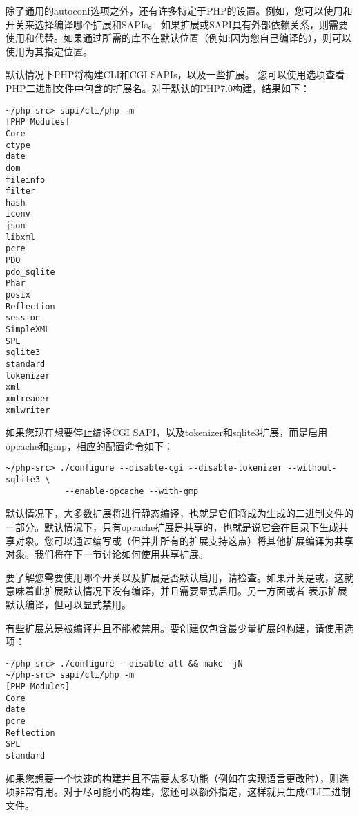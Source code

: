除了通用的autoconf选项之外，还有许多特定于PHP的设置。例如，您可以使用和开关来选择编译哪个扩展和SAPIs。
如果扩展或SAPI具有外部依赖关系，则需要使用和代替。如果通过所需的库不在默认位置（例如:因为您自己编译的），则可以使用为其指定位置。

默认情况下PHP将构建CLI和CGI SAPIs，以及一些扩展。 您可以使用选项查看PHP二进制文件中包含的扩展名。对于默认的PHP7.0构建，结果如下：

\begin{lstlisting}[language=shell]
~/php-src> sapi/cli/php -m
[PHP Modules]
Core
ctype
date
dom
fileinfo
filter
hash
iconv
json
libxml
pcre
PDO
pdo_sqlite
Phar
posix
Reflection
session
SimpleXML
SPL
sqlite3
standard
tokenizer
xml
xmlreader
xmlwriter
\end{lstlisting}

如果您现在想要停止编译CGI SAPI，以及tokenizer和sqlite3扩展，而是启用opcache和gmp，相应的配置命令如下：

\begin{lstlisting}[language=shell]
~/php-src> ./configure --disable-cgi --disable-tokenizer --without-sqlite3 \
            --enable-opcache --with-gmp
\end{lstlisting}

默认情况下，大多数扩展将进行静态编译，也就是它们将成为生成的二进制文件的一部分。默认情况下，只有opcache扩展是共享的，也就是说它会在目录下生成共享对象。您可以通过编写或（但并非所有的扩展支持这点）将其他扩展编译为共享对象。我们将在下一节讨论如何使用共享扩展。

要了解您需要使用哪个开关以及扩展是否默认启用，请检查。如果开关是或，这就意味着此扩展默认情况下没有编译，并且需要显式启用。另一方面或者 表示扩展默认编译，但可以显式禁用。

有些扩展总是被编译并且不能被禁用。要创建仅包含最少量扩展的构建，请使用选项：

\begin{lstlisting}[language=shell]
~/php-src> ./configure --disable-all && make -jN
~/php-src> sapi/cli/php -m
[PHP Modules]
Core
date
pcre
Reflection
SPL
standard
\end{lstlisting}

如果您想要一个快速的构建并且不需要太多功能（例如在实现语言更改时），则选项非常有用。对于尽可能小的构建，您还可以额外指定，这样就只生成CLI二进制文件。

